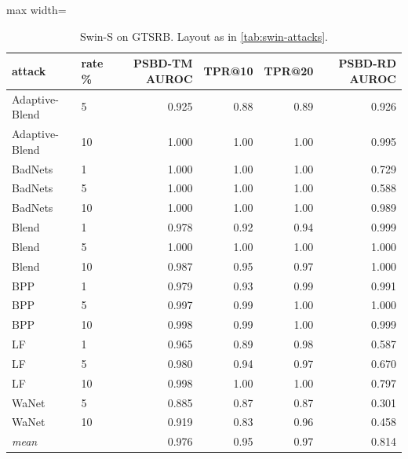 \begin{table}[htbp]
\centering
\small
\caption{Swin-S on GTSRB. Layout as in \cref{tab:swin-attacks}.}
\label{tab:swin-attacks-gtsrb}
\begin{adjustbox}{max width=\linewidth}
\begin{tabular}{llrrrr}
\toprule
attack & rate \% & PSBD-TM AUROC & TPR@10 & TPR@20 & PSBD-RD AUROC \\
\midrule
Adaptive-Blend & 5 & 0.925 & 0.88 & 0.89 & 0.926 \\
Adaptive-Blend & 10 & 1.000 & 1.00 & 1.00 & 0.995 \\
BadNets & 1 & 1.000 & 1.00 & 1.00 & 0.729 \\
BadNets & 5 & 1.000 & 1.00 & 1.00 & 0.588 \\
BadNets & 10 & 1.000 & 1.00 & 1.00 & 0.989 \\
Blend & 1 & 0.978 & 0.92 & 0.94 & 0.999 \\
Blend & 5 & 1.000 & 1.00 & 1.00 & 1.000 \\
Blend & 10 & 0.987 & 0.95 & 0.97 & 1.000 \\
BPP & 1 & 0.979 & 0.93 & 0.99 & 0.991 \\
BPP & 5 & 0.997 & 0.99 & 1.00 & 1.000 \\
BPP & 10 & 0.998 & 0.99 & 1.00 & 0.999 \\
LF & 1 & 0.965 & 0.89 & 0.98 & 0.587 \\
LF & 5 & 0.980 & 0.94 & 0.97 & 0.670 \\
LF & 10 & 0.998 & 1.00 & 1.00 & 0.797 \\
WaNet & 5 & 0.885 & 0.87 & 0.87 & 0.301 \\
WaNet & 10 & 0.919 & 0.83 & 0.96 & 0.458 \\
\rowcolor{black!8}\emph{mean} &  & 0.976 & 0.95 & 0.97 & 0.814 \\
\bottomrule
\end{tabular}
\end{adjustbox}
\end{table}
